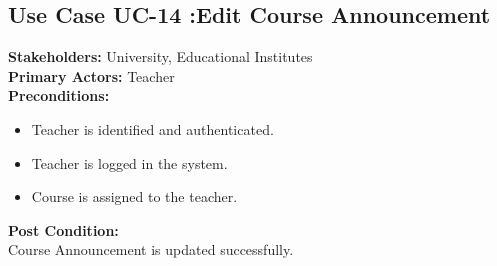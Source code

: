 \subsection{Use Case UC-14 :Edit Course Announcement}
\textbf{Stakeholders: } University, Educational Institutes \\
\textbf{Primary Actors: }Teacher \\
\textbf{Preconditions:}
\begin{itemize}
\item Teacher is identified and authenticated.
\item Teacher is logged in the system.
\item Course is assigned to the teacher.
\end{itemize}
\textbf{Post Condition: }\\
Course Announcement is updated successfully.\\

